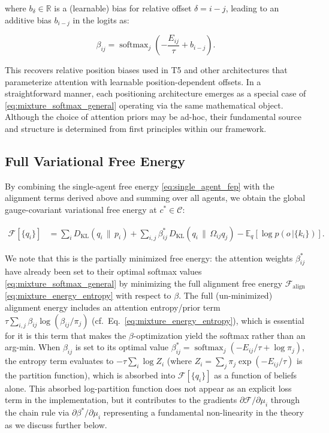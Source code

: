 \documentclass[twoside,11pt]{article}
\newcommand{\softmax}{\operatorname{softmax}}
\begin{document}
where $b_\delta \in \mathbb{R}$ is a (learnable) bias for relative offset $\delta = i - j$, leading to an additive bias $b_{i-j}$ in the logits as:

\begin{equation}
\beta_{ij} = \operatorname{softmax}_j\!\left(-\frac{E_{ij}}{\tau} + b_{i-j}\right).
\label{eq:relative_bias_attention}
\end{equation}

This recovers relative position biases used in T5 \citep{raffel2020exploring} and other architectures that parameterize attention with learnable position-dependent offsets. In a straightforward manner, each positioning architecture emerges as a special case of \eqref{eq:mixture_softmax_general} operating via the same mathematical object. Although the choice of attention priors may be ad-hoc, their fundamental source and structure is determined from first principles within our framework.

\subsection{Full Variational Free Energy}
\label{sec:final_free_energy}

By combining the single-agent free energy \eqref{eq:single_agent_fep} with the alignment terms derived above and summing over all agents, we obtain the global gauge-covariant variational free energy at $c^* \in \mathcal{C}$:

\begin{equation}
\boxed{
\begin{aligned}
\mathcal{F}[\{q_i\}]
&=\sum_i D_{\mathrm{KL}}(q_i\,\|\,p_i)
+\sum_{i,j}\beta_{ij}^*\,D_{\mathrm{KL}}(q_i\,\|\,\Omega_{ij}q_j)
-\mathbb{E}_q[\log p(o\,|\{k_i\})].
\end{aligned}
}
\label{eq:free_energy_final}
\end{equation}

We note that this is the partially minimized free energy: the attention weights $\beta_{ij}^*$ have already been set to their optimal softmax values \eqref{eq:mixture_softmax_general} by minimizing the full alignment free energy $\mathcal{F}_{\text{align}}$ \eqref{eq:mixture_energy_entropy} with respect to $\beta$. The full (un-minimized) alignment energy includes an attention entropy/prior term $\tau\sum_{i,j}\beta_{ij}\log(\beta_{ij}/\pi_j)$ (cf.\ Eq.~\ref{eq:mixture_energy_entropy}), which is essential for it is this term that makes the $\beta$-optimization yield the softmax rather than an arg-min. When $\beta_{ij}$ is set to its optimal value $\beta_{ij}^* = \softmax_j(-E_{ij}/\tau + \log\pi_j)$, the entropy term evaluates to $-\tau\sum_i\log Z_i$ (where $Z_i = \sum_j \pi_j\exp(-E_{ij}/\tau)$ is the partition function), which is absorbed into $\mathcal{F}[\{q_i\}]$ as a function of beliefs alone. This absorbed log-partition function does not appear as an explicit loss term in the implementation, but it contributes to the gradients $\partial\mathcal{F}/\partial\mu_i$ through the chain rule via $\partial\beta^*/\partial\mu_i$ representing a fundamental non-linearity in the theory as we discuss further below.
\end{document}
